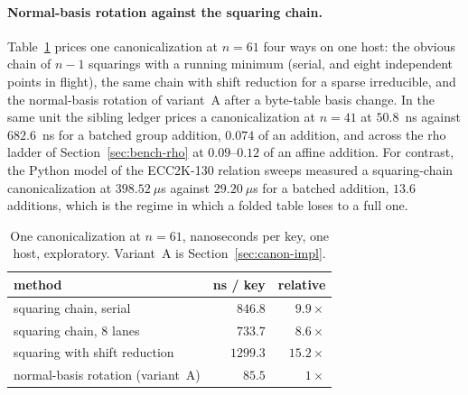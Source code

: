 \paragraph{Normal-basis rotation against the squaring chain.}
Table~\ref{tab:canon-cost} prices one canonicalization at $n=61$ four
ways on one host: the obvious chain of $n-1$ squarings with a running
minimum (serial, and eight independent points in flight), the same
chain with shift reduction for a sparse irreducible, and the
normal-basis rotation of variant~A after a byte-table basis
change.
In the same unit the sibling ledger prices a canonicalization at
$n=41$ at $50.8$~ns against $682.6$~ns for a batched group addition,
$0.074$ of an addition, and across the rho ladder of
Section~\ref{sec:bench-rho} at $0.09$--$0.12$ of an affine
addition. For contrast, the Python model of the ECC2K-130 relation sweeps
measured a squaring-chain canonicalization at $398.52~\mu$s against
$29.20~\mu$s for a batched addition, $13.6$ additions, which is the
regime in which a folded table loses to a full
one.

\begin{table}[t]
\centering\small
\caption{One canonicalization at $n=61$, nanoseconds per key, one host, exploratory. Variant~A is Section~\ref{sec:canon-impl}.}
\label{tab:canon-cost}
\begin{tabular}{@{}lrr@{}}
\toprule
method & ns / key & relative \\
\midrule
squaring chain, serial & $846.8$ & $9.9\times$ \\
squaring chain, 8 lanes & $733.7$ & $8.6\times$ \\
squaring with shift reduction & $1299.3$ & $15.2\times$ \\
normal-basis rotation (variant~A) & $\mathbf{85.5}$ & $1\times$ \\
\bottomrule
\end{tabular}
\end{table}

